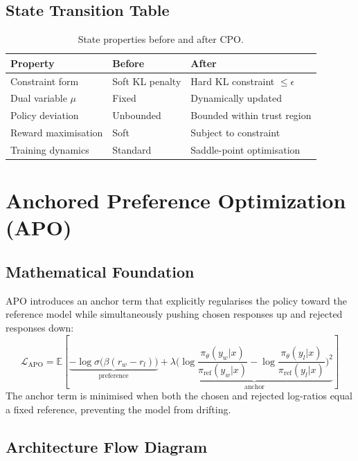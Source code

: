 \documentclass{article}
\begin{document}
\subsection{State Transition Table}
\begin{table}[h]\centering
\begin{tabular}{lll}\toprule
\textbf{Property} & \textbf{Before} & \textbf{After}\\\midrule
Constraint form & Soft KL penalty & Hard KL constraint $\leq \epsilon$\\
Dual variable $\mu$ & Fixed & Dynamically updated\\
Policy deviation & Unbounded & Bounded within trust region\\
Reward maximisation & Soft & Subject to constraint\\
Training dynamics & Standard & Saddle-point optimisation\\\bottomrule
\end{tabular}
\caption{State properties before and after CPO.}
\end{table}

\newpage
\section{Anchored Preference Optimization (APO)}

\subsection{Mathematical Foundation}
APO introduces an anchor term that explicitly regularises the policy toward the reference model while simultaneously pushing chosen responses up and rejected responses down:
\begin{equation}
  \mathcal{L}_{\text{APO}} = \mathbb{E}\!\left[\underbrace{-\log\sigma\bigl(\beta(r_w - r_l)\bigr)}_{\text{preference}} + \lambda\underbrace{\bigl(\log\frac{\pi_\theta(y_w|x)}{\pi_{\text{ref}}(y_w|x)} - \log\frac{\pi_\theta(y_l|x)}{\pi_{\text{ref}}(y_l|x)}\bigr)^2}_{\text{anchor}}\right]
\end{equation}
The anchor term is minimised when both the chosen and rejected log-ratios equal a fixed reference, preventing the model from drifting.

\subsection{Architecture Flow Diagram}
\end{document}
